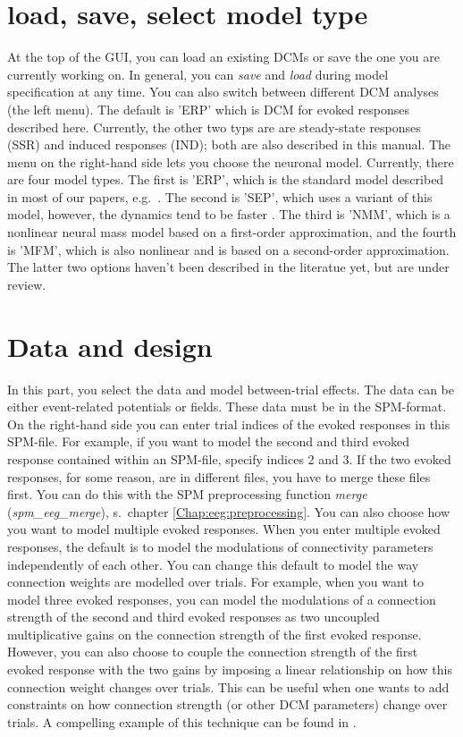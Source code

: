 \section{load, save, select model type}
At the top of the GUI, you can load an existing DCMs or save the one
you are currently working on. In general, you can \textit{save} and
\textit{load} during model specification at any time. You can also
switch between different DCM analyses (the left menu). The default is 'ERP' which is DCM
for evoked responses described here. Currently, the other two typs are are steady-state responses
(SSR) and induced responses (IND); both are also described in this
manual. The menu on the right-hand side lets you choose the neuronal model. Currently, there are four model types. The first is 'ERP', which is the standard model described in most of our papers, e.g.~\cite{od_dcm_erp}. The second is 'SEP', which uses a variant of this model, however, the dynamics tend to be faster \cite{andre_sigmoid}. The third is 'NMM', which is a nonlinear neural mass model based on a first-order approximation, and the fourth is 'MFM', which is also nonlinear and is based on a second-order approximation. The latter two options haven't been described in the literatue yet, but are under review.

\section{Data and design}
In this part, you select the data and model between-trial
effects. The data can be either event-related 
potentials or fields. These data must be in the SPM-format. On the
right-hand side you can enter trial indices of the evoked responses in
this SPM-file. For example, if you want to model the
second and third evoked response contained within an SPM-file, specify
indices 2 and 3. If the two evoked responses, for some reason, are in
different files, you have to merge these files first. You can do this
with the SPM preprocessing function \textit{merge}
(\textit{spm\_eeg\_merge}), s.~chapter
\ref{Chap:eeg:preprocessing}. You can also choose how you want to
model multiple evoked responses. When you enter multiple evoked
responses, the default is to model the modulations of connectivity
parameters independently of each other. You can change this default to
model the way connection weights are modelled over trials. For
example, when you want to model three evoked responses, you can model
the modulations of a connection strength of the second and third
evoked responses as two uncoupled multiplicative gains on the connection
strength of the first evoked response. However, you can also choose to
couple the connection strength of the first evoked response with the
two gains by imposing a linear relationship on how this connection
weight changes over trials. This can be useful when one wants to add
constraints on how connection strength (or other DCM parameters)
change over trials. A compelling example of this technique can be
found in \cite{marta_mmndcm}.

